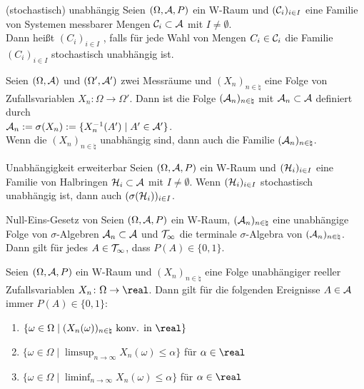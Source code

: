 \linie

\begin{Def}{(stochastisch) unabhängig}
    Seien $(\Omega, \mathcal{A}, P)$ ein W-Raum und
    $(\mathcal{C}_i)_{i \in I}$ eine Familie von Systemen messbarer Mengen $\mathcal{C}_i \subset \mathcal{A}$ mit
    $I \not= \emptyset$.\\
    Dann heißt $(C_i)_{i \in I}$ , falls
    für jede Wahl von Mengen $C_i \in \mathcal{C}_i$ die Familie $(C_i)_{i \in I}$
    stochastisch unabhängig ist.
\end{Def}

\begin{Bsp}
    Seien $(\Omega, \mathcal{A})$ und $(\Omega', \mathcal{A}')$ zwei Messräume und
    $(X_n)_{n \in \natural}$ eine Folge von Zufallsvariablen
    $X_n\colon \Omega \rightarrow \Omega'$.
    Dann ist die Folge $(\mathcal{A}_n)_{n \in \natural}$ mit $\mathcal{A}_n \subset \mathcal{A}$ definiert durch\\
    $\mathcal{A}_n := \sigma(X_n) := \{X_n^{-1}(A') \;|\; A' \in \mathcal{A}'\}$.\\
    Wenn die $(X_n)_{n \in \natural}$ unabhängig sind, dann auch die Familie
    $(\mathcal{A}_n)_{n \in \natural}$.
\end{Bsp}

\begin{Satz}{Unabhängigkeit erweiterbar}
    Seien $(\Omega, \mathcal{A}, P)$ ein W-Raum und
    $(\mathcal{H}_i)_{i \in I}$ eine Familie von Halbringen $\mathcal{H}_i \subset \mathcal{A}$ mit $I \not= \emptyset$.
    Wenn $(\mathcal{H}_i)_{i \in I}$ stochastisch unabhängig ist, dann auch
    $(\sigma(\mathcal{H}_i))_{i \in I}$.
\end{Satz}

\linie

\begin{Satz}{Null-Eins-Gesetz von \upshape\;\!}
    Seien $(\Omega, \mathcal{A}, P)$ ein W-Raum, $(\mathcal{A}_n)_{n \in \natural}$ eine unabhängige Folge
    von $\sigma$-Algebren $\mathcal{A}_n \subset \mathcal{A}$ und $\mathcal{T}_\infty$ die terminale $\sigma$-Algebra von
    $(\mathcal{A}_n)_{n \in \natural}$.\\
    Dann gilt für jedes $A \in \mathcal{T}_\infty$, dass $P(A) \in \{0, 1\}$.
\end{Satz}

\begin{Kor}
    Seien $(\Omega, \mathcal{A}, P)$ ein W-Raum und $(X_n)_{n \in \natural}$ eine Folge
    unabhängiger reeller Zufallsvariablen $X_n\colon \Omega \rightarrow \real$.
    Dann gilt für die folgenden Ereignisse $A \in \mathcal{A}$ immer $P(A) \in \{0, 1\}$:
    \begin{enumerate}
        \item
        $\{\omega \in \Omega \;|\; (X_n(\omega))_{n \in \natural} \text{ konv. in } \real\}$

        \item
        $\{\omega \in \Omega \;|\; \limsup_{n \to \infty} X_n(\omega) \le \alpha\}$
        für $\alpha \in \real$

        \item
        $\{\omega \in \Omega \;|\; \liminf_{n \to \infty} X_n(\omega) \le \alpha\}$
        für $\alpha \in \real$
    \end{enumerate}
\end{Kor}


